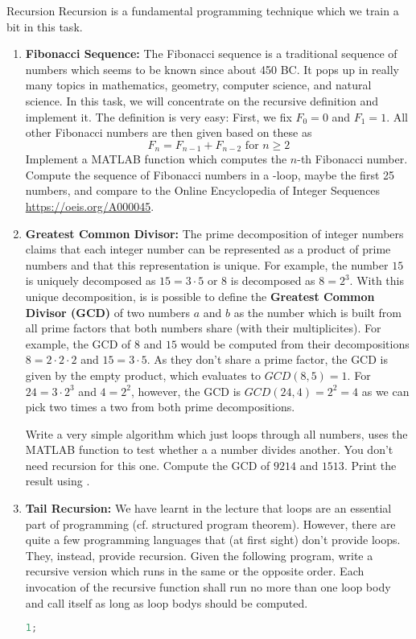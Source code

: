 \begin{task}{Recursion}{}{}
  Recursion is a fundamental programming technique which we train a bit in this task.
  \begin{enumerate}

  \item{\textbf{Fibonacci Sequence:}
    The Fibonacci sequence is a traditional sequence of numbers which seems to be known since about 450 BC. It pops up in really many topics in mathematics, geometry, computer science, and natural science. In this task, we will concentrate on the recursive definition and implement it.
    The definition is very easy: First, we fix $F_0=0$ and $F_1=1$. All other Fibonacci numbers are then given based on these as
    \[
    F_n = F_{n-1} + F_{n-2} \text{  for } n \ge 2
    \]
    Implement a MATLAB function  which computes the $n$-th Fibonacci number. Compute the sequence of Fibonacci numbers in a -loop, maybe the first 25 numbers, and compare to the Online Encyclopedia of Integer Sequences \url{https://oeis.org/A000045}.
		}




    
  \item{\textbf{Greatest Common Divisor:}
    The prime decomposition of integer numbers claims that each integer number can be represented as a product of prime numbers and
    that this representation is unique. For example, the number $15$ is uniquely decomposed as $15=3\cdot5$ or $8$ is decomposed as
    $8= 2^3$. With this unique decomposition, is is possible to define the \textbf{Greatest Common Divisor (GCD)} of two numbers $a$ and $b$ as the number which is built from all prime factors that both numbers share (with their multiplicites). For example, the GCD of
    $8$ and $15$ would be computed from their decompositions $8=2\cdot 2\cdot 2$ and $15 = 3 \cdot 5$. As they don't share a prime factor, the GCD is given by the empty product, which evaluates to $GCD(8,5)=1$. For $24= 3 \cdot 2^3$ and $4=2^2$, however, the GCD is
    $GCD(24,4) = 2^2 =4$ as we can pick two times a two from both prime decompositions.

    Write a very simple algorithm which just loops through all numbers, uses the MATLAB  function to test whether a
    a number divides another. You don't need recursion for this one. Compute the GCD of $9214$ and $1513$. Print the result using .
  }
     
  \item{\textbf{Tail Recursion:} We have learnt in the lecture that loops are an essential part of programming (cf. structured program theorem). However, there are quite a few programming languages that (at first sight) don't provide loops. They, instead, provide recursion. Given the following program, write a recursive version which runs in the same or the opposite order. Each invocation of the recursive function shall run no more than one loop body and call itself as long as loop bodys should be computed.
\begin{lstlisting}[language=matlab]
1;


\end{lstlisting}}
\end{enumerate}
\end{task}
